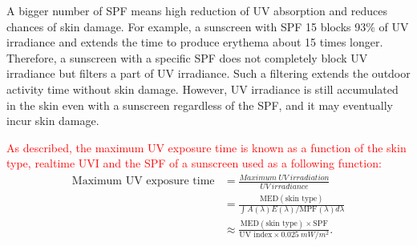 \documentclass[journal]{IEEEtran}
\begin{document}
A bigger number of SPF means high reduction of UV absorption and reduces chances of skin damage. For example, a sunscreen with SPF 15 blocks 93\% of UV irradiance and extends the time to produce erythema about 15 times longer. Therefore, a sunscreen with a specific SPF does not completely block UV irradiance but filters a part of UV irradiance. Such a filtering extends the outdoor activity time without skin damage. However, UV irradiance is still accumulated in the skin even with a sunscreen regardless of the SPF, and it may eventually incur skin damage.

\textcolor{red}{As described, the maximum UV exposure time is known as a function of the skin type, realtime UVI and the SPF of a sunscreen used as a following function:}
%
%
\begin{equation} \label{eq: max_exp_time}
\begin{split}
\text{Maximum~UV~exposure~time}
&= \frac{Maximum~UV~irradiation}{UV~irradiance} \\
&= \frac{\text{MED}(\text{skin~type})}{\int A(\lambda)E(\lambda)  / \text{MPF}(\lambda) d \lambda} \\
&\approx \frac{\text{MED}(\text{skin~type})\times \text{SPF}}{\text{UV~index} \times 0.025~mW/m^2}.
\end{split}
\end{equation}


%
%
\end{document}
